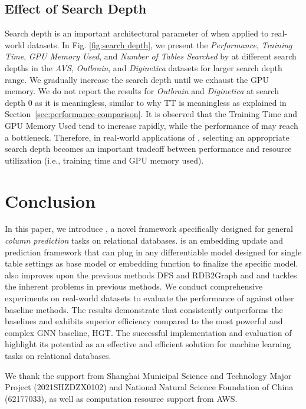\subsection{Effect of Search Depth}
Search depth is an important architectural parameter of \model{} when applied to real-world datasets. In Fig. \ref{fig:search depth}, we present the \textit{Performance}, \textit{Training Time}, \textit{GPU Memory Used}, and \textit{Number of Tables Searched} by \model{} at different search depths in the \textit{AVS}, \textit{Outbrain}, and \textit{Diginetica} datasets for larger search depth range. We gradually increase the search depth until we exhaust the GPU memory. We do not report the results for \textit{Outbrain} and \textit{Diginetica} at search depth 0 as it is meaningless, similar to why TT is meaningless as explained in Section~\ref{sec:performance-comparison}. It is observed that the Training Time and GPU Memory Used tend to increase rapidly, while the performance of \model{} may reach a bottleneck. Therefore, in real-world applications of \model{}, selecting an appropriate search depth becomes an important tradeoff between performance and resource utilization (i.e., training time and GPU memory used).

\section{Conclusion}\label{sec:conclusion}
In this paper, we introduce \model{}, a novel framework specifically designed for general \emph{column prediction} tasks on relational databases. \model{} is an embedding update and prediction framework that can plug in any differentiable model designed for single table settings as base model or embedding function to finalize the specific model. \model{} also improves upon the previous methods DFS and RDB2Graph and and tackles the inherent problems in previous methods. We conduct comprehensive experiments on real-world datasets to evaluate the performance of \model{} against other baseline methods. The results demonstrate that \model{} consistently outperforms the baselines and exhibits superior efficiency compared to the most powerful and complex GNN baseline, HGT. The successful implementation and evaluation of \model{} highlight its potential as an effective and efficient solution for machine learning tasks on relational databases. 

\begin{acks}
We thank the support from Shanghai Municipal Science and Technology Major Project (2021SHZDZX0102) and National Natural Science Foundation of China (62177033), as well as computation resource support from AWS. 
\end{acks}

